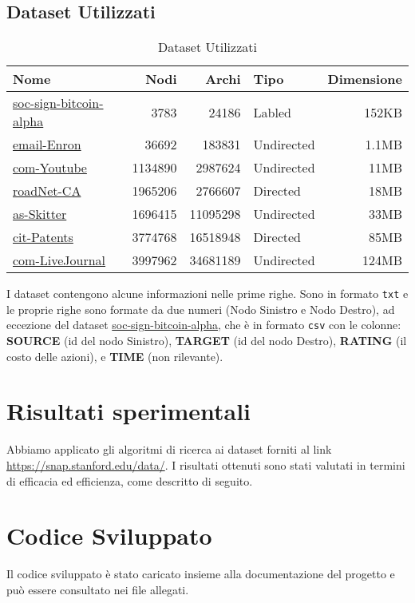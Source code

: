 \documentclass{article}
\begin{document}
\subsection{Dataset Utilizzati}
\begin{table}[h]
  \centering
  \begin{tabular}{|l|r|r|l|r|}
    \hline
    Nome                                                                                      & Nodi    & Archi    & Tipo       & Dimensione \\
    \hline
    \href{https://snap.stanford.edu/data/soc-sign-bitcoin-alpha.html}{soc-sign-bitcoin-alpha} & 3783    & 24186    & Labled     & 152KB      \\
    \href{https://snap.stanford.edu/data/email-Enron.html}{email-Enron}                       & 36692   & 183831   & Undirected & 1.1MB      \\
    \href{https://snap.stanford.edu/data/com-Youtube.html}{com-Youtube}                       & 1134890 & 2987624  & Undirected & 11MB       \\
    \href{https://snap.stanford.edu/data/roadNet-CA.html}{roadNet-CA}                         & 1965206 & 2766607  & Directed   & 18MB       \\
    \href{https://snap.stanford.edu/data/as-Skitter.html}{as-Skitter}                         & 1696415 & 11095298 & Undirected & 33MB       \\
    \href{https://snap.stanford.edu/data/cit-Patents.html}{cit-Patents}                       & 3774768 & 16518948 & Directed   & 85MB       \\
    \href{https://snap.stanford.edu/data/com-LiveJournal.html}{com-LiveJournal}               & 3997962 & 34681189 & Undirected & 124MB      \\
    \hline
  \end{tabular}
  \caption{Dataset Utilizzati}
\end{table}

I dataset contengono alcune informazioni nelle prime righe. Sono in formato \texttt{txt} e le proprie righe sono formate da due numeri (Nodo Sinistro e Nodo Destro), ad eccezione del dataset \href{https://snap.stanford.edu/data/soc-sign-bitcoin-alpha.html}{soc-sign-bitcoin-alpha}, che è in formato \texttt{csv} con le colonne: \textbf{SOURCE} (id del nodo Sinistro), \textbf{TARGET} (id del nodo Destro), \textbf{RATING} (il costo delle azioni), e \textbf{TIME} (non rilevante).

\section{Risultati sperimentali}
Abbiamo applicato gli algoritmi di ricerca ai dataset forniti al link \url{https://snap.stanford.edu/data/}. I risultati ottenuti sono stati valutati in termini di efficacia ed efficienza, come descritto di seguito.



\section{Codice Sviluppato}
Il codice sviluppato è stato caricato insieme alla documentazione del progetto e può essere consultato nei file allegati.
\end{document}
